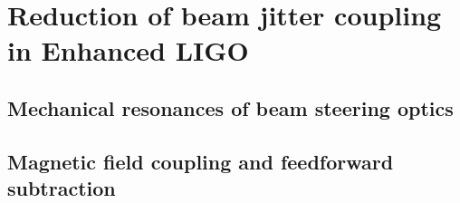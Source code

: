 \chapter{Reduction of beam jitter coupling in Enhanced LIGO}

\section{Mechanical resonances of beam steering optics}

\section{Magnetic field coupling and feedforward subtraction}